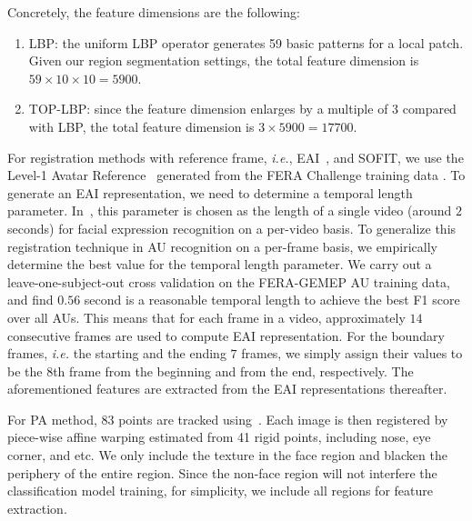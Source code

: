 \documentclass[10pt,journal]{IEEEtran}
\begin{document}
Concretely, the feature dimensions are the following:
\begin{enumerate}
\item LBP: the uniform LBP operator generates 59 basic patterns for a local patch. Given our region segmentation settings, the total feature dimension is $59\times 10\times 10=5900$. 
\item TOP-LBP: since the feature dimension enlarges by a multiple of $3$ compared with LBP, the total feature dimension is $3\times 5900=17700$.
\end{enumerate} 



For registration methods with reference frame, \textit{i.e.}, EAI~\cite{Yang_SMCB12}, and SOFIT, we use the Level-1 Avatar Reference~\cite{Yang_SMCB12} generated from the FERA Challenge training data \cite{FERA11}. To generate an EAI representation, we need to determine a temporal length parameter. In~\cite{Yang_SMCB12}, this parameter is chosen as the length of a single video (around $2$ seconds) for facial expression recognition on a per-video basis. To generalize this registration technique in AU recognition on a per-frame basis, we empirically determine the best value for the temporal length parameter. We carry out a leave-one-subject-out cross validation on the FERA-GEMEP AU training data, and find $0.56$ second is a reasonable temporal length to achieve the best F1 score over all AUs. This means that for each frame in a video, approximately $14$ consecutive frames are used to compute EAI representation. For the boundary frames, \textit{i.e.} the starting and the ending $7$ frames, we simply assign their values to be the $8$th frame from the beginning and from the end, respectively. The aforementioned features are extracted from the EAI representations thereafter.

For PA method, 83 points are tracked using~\cite{Tadas_ECCV14}. Each image is then registered by piece-wise affine warping estimated from 41 rigid points, including nose, eye corner, and etc. We only include the texture in the face region and blacken the periphery of the entire region. Since the non-face region will not interfere the classification model training, for simplicity, we include all regions for feature extraction.  
\end{document}
